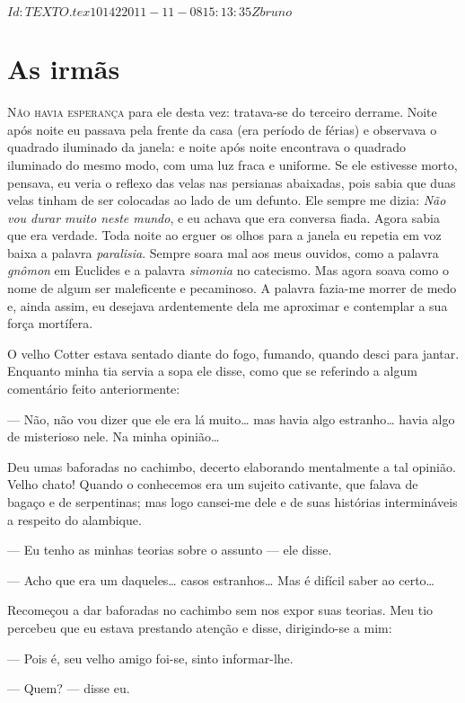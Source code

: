\SVN $Id: TEXTO.tex 10142 2011-11-08 15:13:35Z bruno $

\chapter{As irmãs}

\textsc{Não havia esperança} para ele desta vez: tratava-se do terceiro derrame.
Noite após noite eu passava pela frente da casa (era período de
férias) e observava o quadrado iluminado da janela: e noite após noite
encontrava o quadrado iluminado do mesmo modo, com uma luz fraca e
uniforme. Se ele estivesse morto, pensava, eu veria o reflexo das
velas nas persianas abaixadas, pois sabia que duas velas tinham de
ser colocadas ao lado de um defunto. Ele sempre me dizia: \textit{Não vou
durar muito neste mundo}, e eu achava que era conversa fiada. Agora
sabia que era verdade. Toda noite ao erguer os olhos para a janela eu
repetia em voz baixa a palavra \textit{paralisia}. Sempre soara mal aos meus
ouvidos, como a palavra \textit{gnômon} em Euclides e a palavra \textit{simonia} no
catecismo. Mas agora soava como o nome de algum ser maleficente e
pecaminoso. A palavra fazia-me morrer de medo e, ainda assim, eu
desejava ardentemente dela me aproximar e contemplar a sua força
mortífera.

O velho Cotter estava sentado diante do fogo, fumando, quando desci
para jantar. Enquanto minha tia servia a sopa ele disse, como que se
referindo a algum comentário feito anteriormente:

--- Não, não vou dizer que ele era lá muito\ldots{} mas havia algo
estranho\ldots{} havia algo de misterioso nele. Na minha opinião\ldots{}

Deu umas baforadas no cachimbo, decerto elaborando mentalmente a tal
opinião. Velho chato! Quando o conhecemos era um sujeito cativante,
que falava de bagaço e de serpentinas; mas logo cansei-me dele e de
suas histórias intermináveis a respeito do alambique.

--- Eu tenho as minhas teorias sobre o assunto --- ele disse.

--- Acho que era um daqueles\ldots{} casos estranhos\ldots{} Mas é difícil saber
ao certo\ldots{}

Recomeçou a dar baforadas no cachimbo sem nos expor suas teorias. Meu
tio percebeu que eu estava prestando atenção e disse, dirigindo-se a
mim:

--- Pois é, seu velho amigo foi-se, sinto informar-lhe.

--- Quem? --- disse eu.

